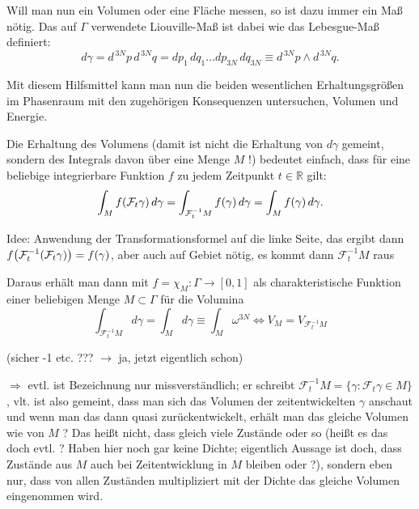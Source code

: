 Will man nun ein Volumen oder eine Fläche messen, so ist dazu immer ein Maß nötig. Das auf $\Gamma$ verwendete Liouville-Maß ist dabei wie das Lebesgue-Maß definiert:
\begin{equation}\label{key}
d\gamma = d^{\,3N}p \, d^{\,3N}q = dp_1 \, dq_1 \dots dp_{3N} \, dq_{3N} \equiv d^{\,3N}p \wedge d^{\,3N}q .
\end{equation}

Mit diesem Hilfsmittel kann man nun die beiden wesentlichen Erhaltungsgrößen im Phasenraum mit den zugehörigen Konsequenzen untersuchen, Volumen und Energie.

Die Erhaltung des Volumens (damit ist nicht die Erhaltung von $d\gamma$ gemeint, sondern des Integrals davon über eine Menge $M$ !) bedeutet einfach, dass für eine beliebige integrierbare Funktion $f$ zu jedem Zeitpunkt $t \in \mathbb{R}$ gilt:
\begin{equation}\label{eq:zeitentw}
\int_M f\qty(\mathcal{F}_t \gamma) \, d\gamma = \int_{\mathcal{F}_t^{-1} M} f\qty(\gamma) \, d\gamma = \int_M f(\gamma) \, d\gamma.
\end{equation}

Idee: Anwendung der Transformationsformel auf die linke Seite, das ergibt dann $f\qty(\mathcal{F}_t^{-1}(\mathcal{F}_t \gamma)) = f(\gamma)$, aber auch auf Gebiet nötig, es kommt dann $\mathcal{F}_t^{-1}M$ raus


Daraus erhält man dann mit $f = \chi_M: \Gamma \rightarrow [0,1]$ als charakteristische Funktion einer beliebigen Menge $M \subset \Gamma$ für die Volumina
\begin{equation}\label{key}
\int_{\mathcal{F}_t^{-1} M} d\gamma = \int_M d\gamma  \equiv \int_M \omega^{3N} \Leftrightarrow V_M = V_{\mathcal{F}_t^{-1}M}
\end{equation}

(sicher -1 etc. ??? $\rightarrow$ ja, jetzt eigentlich schon)

$\Rightarrow$ evtl. ist Bezeichnung nur missverständlich; er schreibt $\mathcal{F}_t^{-1}M = \{\gamma: \mathcal{F}_t \gamma \in M\}$, vlt. ist also gemeint, dass man sich das Volumen der zeitentwickelten $\gamma$ anschaut und wenn man das dann quasi zurückentwickelt, erhält man das gleiche Volumen wie von $M$ ? Das heißt nicht, dass gleich viele Zustände oder so (heißt es das doch evtl. ? Haben hier noch gar keine Dichte; eigentlich Aussage ist doch, dass Zustände aus $M$ auch bei Zeitentwicklung in $M$ bleiben oder ?), sondern eben nur, dass von allen Zuständen multipliziert mit der Dichte das gleiche Volumen eingenommen wird.

